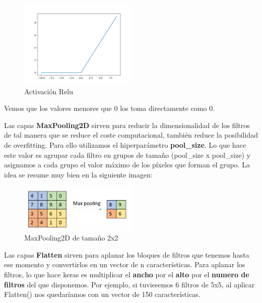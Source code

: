 \begin{figure}[H]
\centering
  \includegraphics[width=0.5\textwidth]{Imagenes/relu.png}
   \caption{Activación Relu}
\end{figure}

\vspace{5 mm}

Vemos que los valores menores que 0 los toma directamente como 0.

\newpage

Las capas \textbf{MaxPooling2D} sirven para reducir la dimensionalidad de los filtros de tal manera que se reduce el coste computacional, también reduce la posibilidad de overfitting. Para ello utilizamos el hiperparámetro \textbf{pool\_size}. Lo que hace este valor es agrupar cada filtro en grupos de tamaño (pool\_size x pool\_size) y asignamos a cada grupo el valor máximo de los píxeles que forman el grupo. La idea se resume muy bien en la siguiente imagen:

\vspace{5 mm}

\begin{figure}[H]
\centering
  \includegraphics[width=0.5\textwidth]{Imagenes/pooling.jpg}
   \caption{MaxPooling2D de tamaño 2x2}
\end{figure}

\vspace{5 mm}

Las capas \textbf{Flatten} sirven para aplanar los bloques de filtros que tenemos hasta ese momento y convertirlos en un vector de n características. Para aplanar los filtros, lo que hace keras es multiplicar el \textbf{ancho} por el \textbf{alto} por el \textbf{numero de filtros} del que disponemos. Por ejemplo, si tuviesemos 6 filtros de 5x5, al aplicar Flatten() nos quedaríamos con un vector de 150 características.

